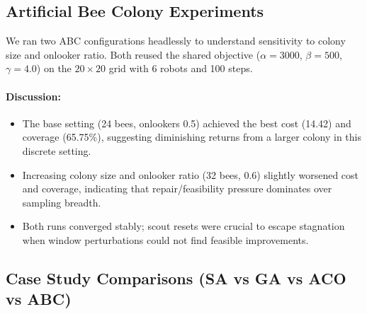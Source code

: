 \subsection{Artificial Bee Colony Experiments}

We ran two ABC configurations headlessly to understand sensitivity to colony size and onlooker ratio. Both reused the shared objective ($\alpha=3000$, $\beta=500$, $\gamma=4.0$) on the $20\times20$ grid with 6 robots and 100 steps.

\begin{table}[H]
\centering
\caption{ABC Parameter Sweep (headless runs)}
%
\label{tab:abc_sweep}
\end{table}

\paragraph{Discussion:}
\begin{itemize}
    \item The base setting (24 bees, onlookers 0.5) achieved the best cost (14.42) and coverage (65.75\%), suggesting diminishing returns from a larger colony in this discrete setting.
    \item Increasing colony size and onlooker ratio (32 bees, 0.6) slightly worsened cost and coverage, indicating that repair/feasibility pressure dominates over sampling breadth.
    \item Both runs converged stably; scout resets were crucial to escape stagnation when window perturbations could not find feasible improvements.
\end{itemize}

\subsection{Case Study Comparisons (SA vs GA vs ACO vs ABC)}

